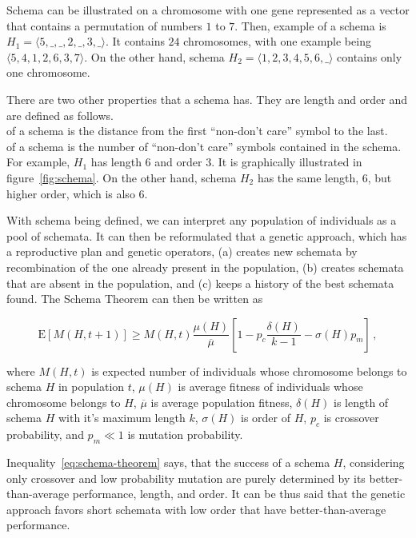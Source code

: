 Schema can be illustrated on a chromosome with one gene represented as a vector that contains a permutation of numbers $1$ to $7$.
Then, example of a schema is $H_1 = \langle 5, \_, \_, 2, \_, 3, \_ \rangle$.
It contains $24$ chromosomes, with one example being $\langle 5, 4, 1, 2, 6, 3, 7 \rangle$.
On the other hand, schema $H_2 = \langle 1, 2, 3, 4, 5, 6, \_ \rangle$ contains only one chromosome.

\newpage
There are two other properties that a schema has.
They are length and order and are defined as follows.\\

 of a schema is the distance from the first “non-don’t care” symbol to the last.\\

 of a schema is the number of “non-don’t care” symbols contained in the schema.\\

For example, $H_1$ has length $6$ and order $3$.
It is graphically illustrated in figure~\ref{fig:schema}.
On the other hand, schema $H_2$ has the same length, $6$, but higher order, which is also $6$.

With schema being defined, we can interpret any population of individuals as a pool of schemata.
It can then be reformulated that a genetic approach, which has a reproductive plan and
genetic operators, (a) creates new schemata by recombination of the one already present in the population,
(b) creates schemata that are absent in the population, and (c) keeps a history of the best schemata found.
The Schema Theorem can then be written as

\begin{equation}
    \mathrm{E}[M(H, t+1)] \geq M(H, t) \dfrac{\mu(H)}{\overline{\mu}}\left[ 1 - p_c \dfrac{\delta(H)}{k-1} - \sigma(H)
    p_m \right]\,,
    \label{eq:schema-theorem}
\end{equation}

where $M(H, t)$ is expected number of individuals whose chromosome belongs to schema $H$ in population $t$,
$\mu(H)$ is average fitness of individuals whose chromosome belongs to $H$,
$\overline{\mu}$ is average population fitness,
$\delta(H)$ is length of schema $H$ with it’s maximum length $k$,
$\sigma(H)$ is order of $H$,
$p_c$ is crossover probability, and
$p_m \ll 1$ is mutation probability.

Inequality~\ref{eq:schema-theorem} says, that the success of a schema $H$,
considering only crossover and low probability mutation are purely determined
by its better-than-average performance, length, and order.
It can be thus said that the genetic approach favors
short schemata with low order that have better-than-average performance.

